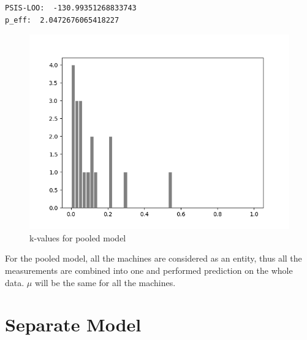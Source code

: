 \documentclass{article}
\begin{document}
\begin{verbatim}
PSIS-LOO:  -130.99351268833743
p_eff:  2.0472676065418227
\end{verbatim}
 
 

\begin{figure}[H]
\centering  
\includegraphics[scale=0.5]{pooled_hist.png}
\caption{k-values for pooled model}
\label{fig: label}
\end{figure}
For the pooled model, all the machines are considered as an entity, thus all the measurements are combined into one and performed prediction on the whole data. $\mu$ will be the same for all the machines.

\section{Separate Model}
\end{document}
